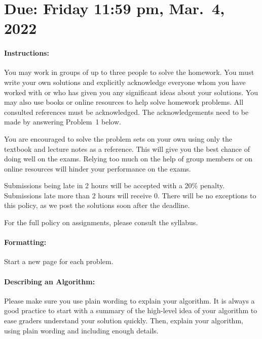 \documentclass[11pt]{article}
\begin{document}
\maketitle

\section*{Due: Friday 11:59 pm, Mar.\ 4, 2022}

\paragraph*{Instructions:}

You may work in groups of up to three people to solve the homework.
You must write your own solutions and explicitly acknowledge everyone whom 
you have worked with or who has given you any significant ideas about your solutions. 
You may also use books or online resources to help solve homework problems.  
All consulted references must be acknowledged. The acknowledgements need to be made by answering Problem~1 below.

You are encouraged to solve the problem sets on your own using only the textbook and lecture notes as a reference. This will give you the best chance of doing well on the exams. Relying too much on the help of group members or on online resources will hinder your performance on the exams.

Submissions being late in 2 hours will be accepted with a 20\% penalty. Submissions late more than 2 hours will receive 0. There will be no exceptions to this policy, as we post the solutions soon after the deadline. 

For the full policy on assignments, please consult the syllabus.

\paragraph*{Formatting:} Start a new page for each problem.

\paragraph*{Describing an Algorithm:} Please make sure you use plain wording to explain your algorithm. It is always a good practice to start with a summary of the high-level idea of your algorithm to ease graders understand your solution quickly. Then, explain your algorithm, using plain wording and including enough details.
\end{document}
